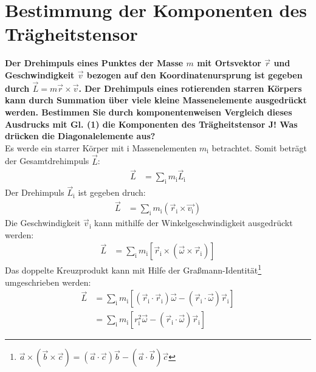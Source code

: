 \section{Bestimmung der Komponenten des Trägheitstensor}
\textbf{Der Drehimpuls eines Punktes der Masse $m$ mit Ortsvektor $\vec{r}$ und Geschwindigkeit $\vec{v}$ bezogen auf den Koordinatenursprung ist gegeben durch $\vec{L}=m\vec{r}\times\vec{v}$. Der Drehimpuls eines rotierenden starren Körpers kann durch Summation über viele kleine Massenelemente ausgedrückt werden. Bestimmen Sie durch komponentenweisen Vergleich dieses Ausdrucks mit Gl. (1) die Komponenten des Trägheitstensor \textbf{J}! Was drücken die Diagonalelemente aus?}\\
Es werde ein starrer Körper mit i Massenelementen $m_\text{i}$ betrachtet. Somit beträgt der Gesamtdrehimpuls $\vec{L}$:
\begin{align}
    \vec{L}&=\sum_\text{i}m_\text{i}\vec{L}_\text{i}
\end{align}
Der Drehimpuls $\vec{L}_\text{i}$ ist gegeben druch:
\begin{align}
    \vec{L}&=\sum_\text{i}m_\text{i}\left(\vec{r}_\text{i}\times\vec{v_\text{i}}\right)
\end{align}
Die Geschwindigkeit $\vec{v}_\text{i}$ kann mithilfe der Winkelgeschwindigkeit ausgedrückt werden:
\begin{align}
    \vec{L}&=\sum_\text{i}m_\text{i}\left[\vec{r}_\text{i}\times\left(\vec{\omega}\times\vec{r}_\text{i}\right)\right]
\end{align}
Das doppelte Kreuzprodukt kann mit Hilfe der Graßmann-Identität\footnote{$\vec{a}\times\left(\vec{b}\times\vec{c}\right)=\left(\vec{a}\cdot\vec{c}\right)\vec{b}-\left(\vec{a}\cdot\vec{b}\right)\vec{c}$} umgeschrieben werden:
\begin{align}
    \vec{L}&=\sum_\text{i}m_\text{i}\left[\left(\vec{r}_\text{i}\cdot\vec{r}_\text{i}\right)\vec{\omega}-\left(\vec{r}_\text{i}\cdot\vec{\omega}\right)\vec{r}_\text{i}\right]\\
    &=\sum_\text{i}m_\text{i}\left[r_\text{i}^2\vec{\omega}-\left(\vec{r}_\text{i}\cdot\vec{\omega}\right)\vec{r}_\text{i}\right]
\end{align}
